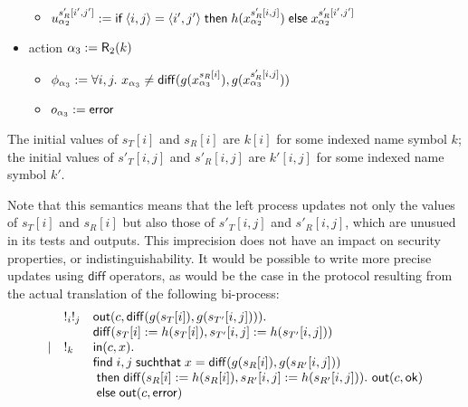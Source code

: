 \begin{example}[OSK]
\begin{itemize}
\begin{itemize}
          \item $u_{\alpha_2}^{s'_R[i',j']} :=
            \textsf{if}\;\langle i,j\rangle=\langle i',j'\rangle \;\textsf{then}\;
            h(x_{\alpha_2}^{s'_R[i,j]})
            \;\textsf{else}\; x_{\alpha_2}^{s'_R[i',j']}$
        \end{itemize}
      \item action $\alpha_3 := \textsf{R}_2(k)$
        \begin{itemize}
          \item $\phi_{\alpha_3} :=
            \forall i,j.~
            x_{\alpha_3} \neq
            \mathsf{diff}(g(x_{\alpha_3}^{s_R[i]}),g(x_{\alpha_3}^{s'_R[i,j]}))$
          \item $o_{\alpha_3} := \mathsf{error}$
        \end{itemize}
    \end{itemize}
    The initial values of $s_T[i]$ and $s_R[i]$ are $k[i]$ for
    some indexed name symbol $k$; the initial values of
    $s'_T[i,j]$ and $s'_R[i,j]$ are $k'[i,j]$ for some
    indexed name symbol $k'$.

    Note that this semantics means that the left process updates not only
    the values of $s_T[i]$ and $s_R[i]$ but also those of
    $s'_T[i,j]$ and $s'_R[i,j]$, which are unusued in its tests and outputs.
    This imprecision does not have an impact on security properties,
    or indistinguishability.
    It would be possible to write more precise updates using $\mathsf{diff}$
    operators, as would be the case in the protocol resulting from the actual
    translation of the following bi-process:
  \[
  \begin{array}{lll}
  & !_i !_j & \mathsf{out}(c,\mathsf{diff}(g(s_T[i]),g(s_{T'}[i,j]))). \\
  && \mathsf{diff}(s_T[i] := h(s_T[i]),s_{T'}[i,j] := h(s_{T'}[i,j])) \\
  \mid
  & !_k & \mathsf{in}(c,x). \\
  && \textsf{find}\; i,j \;\textsf{suchthat}\; x = \mathsf{diff}(g(s_R[i]),g(s_{R'}[i,j])) \\
  && \;\textsf{then}\; \mathsf{diff}(s_R[i] := h(s_R[i]),s_{R'}[i,j] := h(s_{R'}[i,j])) .~\mathsf{out}(c,\mathsf{ok}) \\
  && \;\textsf{else}\; \mathsf{out}(c,\mathsf{error}) \\
  &  & \\
  \end{array}
  \]
\end{example}

